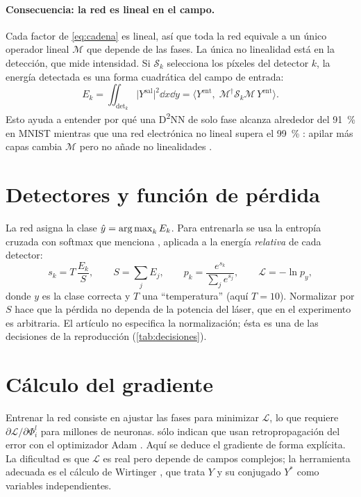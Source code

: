 \paragraph{Consecuencia: la red es lineal en el campo.} Cada factor de \eqref{eq:cadena} es
lineal, así que toda la red equivale a un único operador lineal $\mathcal{M}$ que depende de
las fases. La única no linealidad está en la detección, que mide intensidad. Si
$\mathcal{S}_k$ selecciona los píxeles del detector $k$, la energía detectada es una forma
cuadrática del campo de entrada:
\begin{equation}
  E_k=\iint_{\text{det}_k}\bigl|Y^{\text{sal}}\bigr|^2\dd x\dd y
     =\bigl\langle Y^{\text{ent}},\;\mathcal{M}^\dagger\mathcal{S}_k\mathcal{M}\,Y^{\text{ent}}\bigr\rangle .
  \label{eq:cuadratica}
\end{equation}
Esto ayuda a entender por qué una D\textsuperscript{2}NN de solo fase alcanza alrededor del
\SI{91}{\percent} en MNIST mientras que una red electrónica no lineal supera el
\SI{99}{\percent} \parencite{lecun1998}: apilar más capas cambia $\mathcal{M}$ pero no añade
no linealidades \parencite{mengu2020}.

\section{Detectores y función de pérdida}\label{sec:perdida}

La red asigna la clase $\hat y=\operatorname*{arg\,max}_k E_k$. Para entrenarla se usa la entropía cruzada
con softmax que menciona \textcite{chen2021}, aplicada a la energía \emph{relativa} de cada
detector:
\begin{equation}
  s_k=T\,\frac{E_k}{S},\qquad S=\sum_{j}E_j,\qquad
  p_k=\frac{e^{s_k}}{\sum_j e^{s_j}},\qquad
  \mathcal{L}=-\ln p_y ,
  \label{eq:perdida}
\end{equation}
donde $y$ es la clase correcta y $T$ una ``temperatura'' (aquí $T=10$). Normalizar por $S$
hace que la pérdida no dependa de la potencia del láser, que en el experimento es
arbitraria. El artículo no especifica la normalización; ésta es una de las decisiones de la
reproducción (\cref{tab:decisiones}).

\section{Cálculo del gradiente}\label{sec:gradiente}

Entrenar la red consiste en ajustar las fases para minimizar $\mathcal{L}$, lo que requiere
$\partial\mathcal{L}/\partial\Phi^l_i$ para millones de neuronas. \textcite{chen2021} sólo
indican que usan retropropagación del error con el optimizador Adam \parencite{kingma2015}.
Aquí se deduce el gradiente de forma explícita. La dificultad es que $\mathcal{L}$ es real pero
depende de campos complejos; la herramienta adecuada es el cálculo de Wirtinger
\parencite{wirtinger1927,kreutzdelgado2009}, que trata $Y$ y su conjugado $Y^*$ como
variables independientes.

